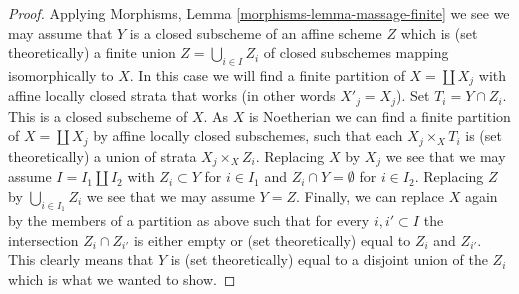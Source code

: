 \documentclass[10pt,a4paper]{amsart}
\theoremstyle{plain}
\theoremstyle{definition}
\theoremstyle{remark}
\numberwithin{equation}{subsection}
\begin{document}
\begin{proof}
\medskip\noindent
Applying Morphisms, Lemma \ref{morphisms-lemma-massage-finite}
we see we may assume that $Y$ is a closed subscheme of an
affine scheme $Z$ which is (set theoretically) a finite union
$Z = \bigcup_{i \in I} Z_i$ of closed subschemes mapping isomorphically
to $X$. In this case we will find a finite partition of $X = \coprod X_j$
with affine locally closed strata that works (in other words $X'_j = X_j$).
Set $T_i = Y \cap Z_i$. This is a closed subscheme of $X$.
As $X$ is Noetherian we can find a finite partition of $X = \coprod X_j$
by affine locally closed subschemes, such that each
$X_j \times_X T_i$ is (set theoretically) a union of strata $X_j \times_X Z_i$.
Replacing $X$ by $X_j$ we see that we may assume $I = I_1 \amalg I_2$
with $Z_i \subset Y$ for $i \in I_1$ and $Z_i \cap Y = \emptyset$ for
$i \in I_2$. Replacing $Z$ by $\bigcup_{i \in I_1} Z_i$ we see that we
may assume $Y = Z$.
Finally, we can replace $X$ again by the members of a partition
as above such that for every $i, i' \subset I$ the intersection
$Z_i \cap Z_{i'}$ is either empty or (set theoretically) equal
to $Z_i$ and $Z_{i'}$. This clearly means that $Y$ is (set theoretically)
equal to a disjoint union of the $Z_i$ which is what we wanted to show.
\end{proof}
\end{document}
